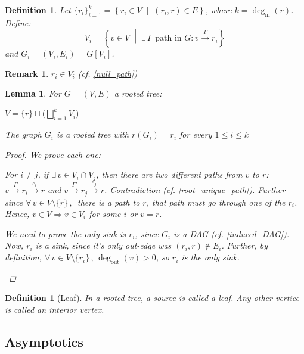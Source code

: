\documentclass[12pt]{article}
\let\RA\Rightarrow
\newcommand{\set}[2]{\left\{{#1}\;\middle|\;{#2}\right\}}
\newcommand{\Forall}[1]{\forall\,{#1}\,,\,}
\newcommand{\Exist}[1]{\exists\,{#1}:}
\newcommand{\rto}[1]{\overset{\displaystyle #1}{\longrightarrow}}
\newcommand{\sm}[1]{\setminus\{#1\}}
\newcommand*{\degin}{\deg_{\text{in}}}
\newcommand*{\degout}{\deg_{\text{out}}}
\newtheorem{definition}[theorem]{Definition}
\newtheorem{lemma}[theorem]{Lemma}
\newtheorem{remark}[theorem]{Remark}
\begin{document}
\begin{definition}
  \label{def_hanging}
  Let $\{r_i\}_{i=1}^k=\set{r_i\in V}{(r_i,r)\in E}$, where $k=\degin(r)$. Define:
  $$V_i=\set{v\in V}{\Exist{\Gamma\text{ path in }G}v\rto{\Gamma}r_i}$$
  and $G_i=(V_i,E_i)=G[V_i]$.
\end{definition}

\begin{remark}
  $r_i\in V_i$ (cf. \ref{null_path})
\end{remark}

\begin{lemma}
  For $G=(V,E)$ a rooted tree:
  \begin{compactenum}
    \item $V=\{r\}\sqcup\big(\bigsqcup_{i=1}^k V_i\big)$
    \item The graph $G_i$ is a rooted tree with $r(G_i)=r_i$ for every $1\leq i\leq k$
  \end{compactenum}
  \begin{proof}
    We prove each one:
    \begin{compactenum}
      \item For $i\neq j$, if $\exists\,v\in V_i\cap V_j$, then there are two different paths from $v$ to $r$: $v\rto{\Gamma}r_i\rto{e_i}r$ and $v\rto{\Gamma'}r_j\rto{e_j}r$. Contradiction (cf. \ref{root_unique_path}). Further since $\Forall{v\in V\sm{r}}$ there is a path to $r$, that path must go through one of the $r_i$. Hence, $v\in V\RA v\in V_i$ for some $i$ or $v=r$.
      \item We need to prove the only sink is $r_i$, since $G_i$ is a DAG (cf. \ref{induced_DAG}). Now, $r_i$ is a sink, since it's only out-edge was $(r_i,r)\notin E_i$. Further, by definition, $\Forall{v\in V\sm{r_i}}\degout(v)>0$, so $r_i$ is the only sink.
    \end{compactenum}
  \end{proof}
\end{lemma}

\begin{definition}[Leaf]
  \label{def_leaf}
  In a rooted tree, a source is called a leaf. Any other vertice is called an interior vertex.
\end{definition}

\pagebreak

\subsection{Asymptotics}
\end{document}
